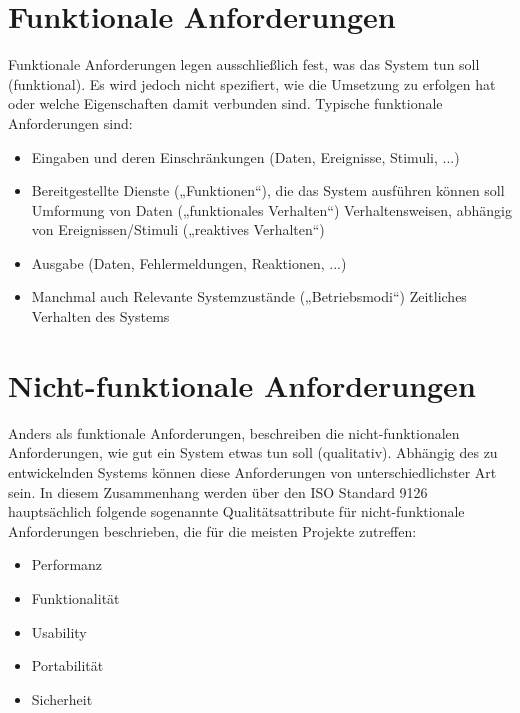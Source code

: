 \cite{partsch-re}

\section{Funktionale Anforderungen}
Funktionale Anforderungen legen ausschließlich fest, was das System tun soll (funktional). Es wird jedoch nicht spezifiert, wie die Umsetzung zu erfolgen hat oder welche Eigenschaften damit verbunden sind. Typische funktionale Anforderungen sind:
\begin{itemize}
	\item Eingaben und deren Einschränkungen (Daten, Ereignisse, Stimuli, ...)
	\item Bereitgestellte Dienste („Funktionen“), die das System ausführen können soll
	\subitem Umformung von Daten („funktionales Verhalten“)
	\subitem Verhaltensweisen, abhängig von Ereignissen/Stimuli („reaktives Verhalten“)
	\item Ausgabe (Daten, Fehlermeldungen, Reaktionen, ...)
	\item 	Manchmal auch
	\subitem Relevante Systemzustände („Betriebsmodi“)
	\subitem Zeitliches Verhalten des Systems
\end{itemize}

\cite{partsch-re}

\section{Nicht-funktionale Anforderungen}
Anders als funktionale Anforderungen, beschreiben die nicht-funktionalen Anforderungen, wie gut ein System etwas tun soll (qualitativ). Abhängig des zu entwickelnden Systems können diese Anforderungen von unterschiedlichster Art sein. In diesem Zusammenhang werden über den ISO Standard 9126 hauptsächlich folgende sogenannte Qualitätsattribute für nicht-funktionale Anforderungen beschrieben, die für die meisten Projekte zutreffen:

\begin{itemize}
	\item Performanz
	\item Funktionalität
	\item Usability
	\item Portabilität
	\item Sicherheit
\end{itemize}

\cite{fraunhofer}

